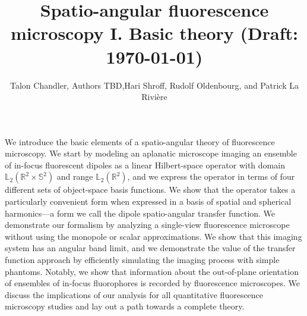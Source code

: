 \documentclass[]{osa-article}
\providecommand{\mbb}[1]{\mathbb{#1}}
\begin{document}
\title{Spatio-angular fluorescence microscopy I. Basic theory (Draft: \today)}

\author{Talon Chandler, Authors TBD,Hari Shroff, Rudolf Oldenbourg, and Patrick La Rivi\`ere }

\address{University of Chicago, Department of Radiology, Chicago, Illinois 60637, USA\\
Publications Department, The Optical Society, 2010 Massachusetts Avenue NW, Washington, DC 20036, USA\\
Currently with the Department of Electronic Journals, The Optical Society, 2010 Massachusetts Avenue NW, Washington, DC 20036, USA}




\begin{abstract*}
  We introduce the basic elements of a spatio-angular theory of fluorescence
  microscopy. We start by modeling an aplanatic microscope imaging an ensemble
  of in-focus fluorescent dipoles as a linear Hilbert-space operator with domain
  $\mbb{L}_2(\mbb{R}^2\times\mbb{S}^2)$ and range $\mbb{L}_2(\mbb{R}^2)$, and we
  express the operator in terms of four different sets of object-space basis
  functions. We show that the operator takes a particularly convenient form when
  expressed in a basis of spatial and spherical harmonics---a form we call the
  dipole spatio-angular transfer function. We demonstrate our formalism by
  analyzing a single-view fluorescence microscope without using the monopole or
  scalar approximations. We show that this imaging system has an angular band
  limit, and we demonstrate the value of the transfer function approach by
  efficiently simulating the imaging process with simple phantoms. Notably, we
  show that information about the out-of-plane orientation of ensembles of
  in-focus fluorophores is recorded by fluorescence microscopes. We discuss the
  implications of our analysis for all quantitative fluorescence microscopy
  studies and lay out a path towards a complete theory.
\end{abstract*}
\end{document}
